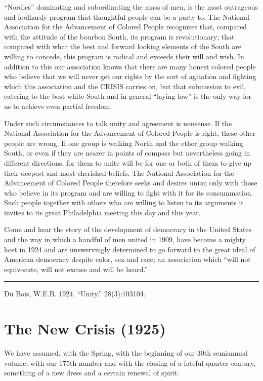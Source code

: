 \documentclass[letterpaper,10pt,english]{jupyterBook}
\begin{document}
\sphinxAtStartPar
“Nordics” dominating and subordinating the mass of men, is the most outrageous and foolhardy program that thoughtful people can be a party to. The National Association for the Advancement of Colored People recognizes that, compared with the attitude of the bourbon South, its program is revolutionary; that compared with what the best and forward looking elements of the South are willing to concede, this program is radical and exceeds their will and wish. In addition to this our association knows that there are many honest colored people who believe that we will never get our rights by the sort of agitation and fighting which this association and the CRISIS carries on, but that submission to evil, catering to the best white South and in general “laying low” is the only way for us to achieve even partial freedom.

\sphinxAtStartPar
Under such circumstances to talk unity and agreement is nonsense. If the National Association for the Advancement of Colored People is right, these other people are wrong. If one group is walking North and the ether group walking South, or even if they are nearer in points of compass but nevertheless going in different directions, for them to unite will be for one or both of them to give up their deepest and most cherished beliefs. The National Association for the Advancement of Colored People therefore seeks and desires union only with those who believe in its program and are willing to fight with it for its consummation. Such people together with others who are willing to listen to its arguments it invites to its great Philadelphia meeting this day and this year.

\sphinxAtStartPar
Come and hear the story of the development of democracy in the United States and the way in which a handful of men united in 1909, have become a mighty host in 1924 and are unswervingly determined to go forward to the great ideal of American democracy despite color, sex and race; an association which “will not equivocate, will not excuse and will be heard.”


\bigskip\hrule\bigskip


\sphinxAtStartPar
{} Du Bois, W.E.B. 1924. “Unity.” 28(3):103\sphinxhyphen{}104.


\section{The New Crisis (1925)}
\label{\detokenize{Volumes/30/01/new_crisis:the-new-crisis-1925}}\label{\detokenize{Volumes/30/01/new_crisis::doc}}
\sphinxAtStartPar
We have assumed, with the Spring, with the beginning  of our 30th semi\sphinxhyphen{}annual volume, with our 175th number and with the closing of a fateful quarter century, something of a new dress and a certain renewal of spirit.
\end{document}

